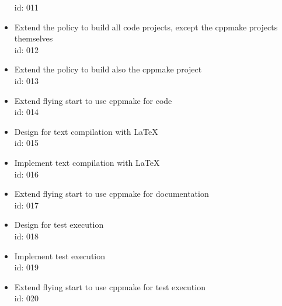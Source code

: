 \begin{itemize}
      id: 011 \\
\item Extend the policy to build all code projects, except the cppmake projects themselves \\ 
      id: 012 \\
\item Extend the policy to build also the cppmake project \\ 
      id: 013 \\
\item Extend flying start to use cppmake for code \\ 
      id: 014 \\
\item Design for text compilation with LaTeX \\
      id: 015 \\
\item Implement text compilation with LaTeX \\
      id: 016 \\
\item Extend flying start to use cppmake for documentation \\ 
      id: 017 \\
\item Design for test execution \\
      id: 018 \\
\item Implement test execution \\
      id: 019 \\
\item Extend flying start to use cppmake for test execution \\ 
      id: 020 \\
\end{itemize}
